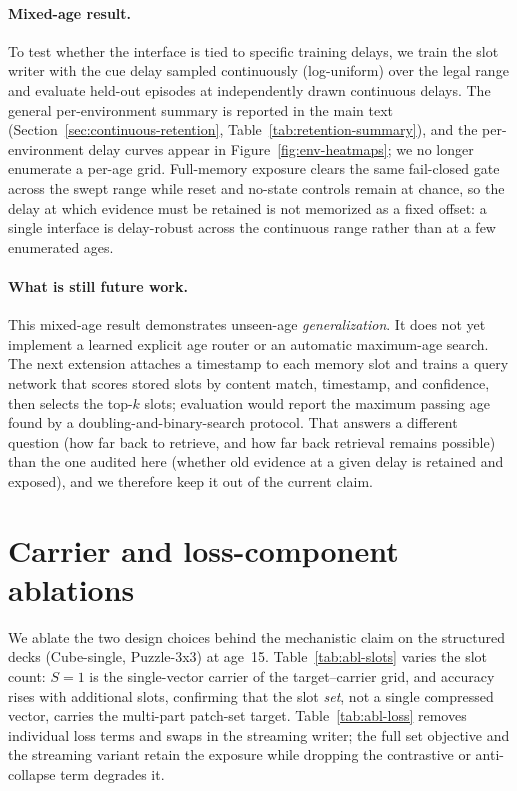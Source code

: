 \paragraph{Mixed-age result.}
To test whether the interface is tied to specific training delays, we train the
slot writer with the cue delay sampled continuously (log-uniform) over the legal
range and evaluate held-out episodes at independently drawn continuous delays.
The general per-environment summary is reported in the main text
(Section~\ref{sec:continuous-retention}, Table~\ref{tab:retention-summary}), and
the per-environment delay curves appear in Figure~\ref{fig:env-heatmaps}; we no
longer enumerate a per-age grid.  Full-memory exposure clears the same
fail-closed gate across the swept range while reset and no-state controls remain
at chance, so the delay at which evidence must be retained is not memorized as a
fixed offset: a single interface is delay-robust across the continuous range
rather than at a few enumerated ages.

\paragraph{What is still future work.}
This mixed-age result demonstrates unseen-age \emph{generalization}.  It does not
yet implement a learned explicit age router or an automatic maximum-age search.
The next extension attaches a timestamp to each memory slot and trains a query
network that scores stored slots by content match, timestamp, and confidence,
then selects the top-$k$ slots; evaluation would report the maximum passing age
found by a doubling-and-binary-search protocol.  That answers a different
question (how far back to retrieve, and how far back retrieval remains possible)
than the one audited here (whether old evidence at a given delay is retained and
exposed), and we therefore keep it out of the current claim.

\section{Carrier and loss-component ablations}
\label{app:ablations}

We ablate the two design choices behind the mechanistic claim on the structured
decks (Cube-single, Puzzle-3x3) at age~15.  Table~\ref{tab:abl-slots} varies the
slot count: $S{=}1$ is the single-vector carrier of the target--carrier grid,
and accuracy rises with additional slots, confirming that the slot \emph{set},
not a single compressed vector, carries the multi-part patch-set target.
Table~\ref{tab:abl-loss} removes individual loss terms and swaps in the
streaming writer; the full set objective and the streaming variant retain the
exposure while dropping the contrastive or anti-collapse term degrades it.

